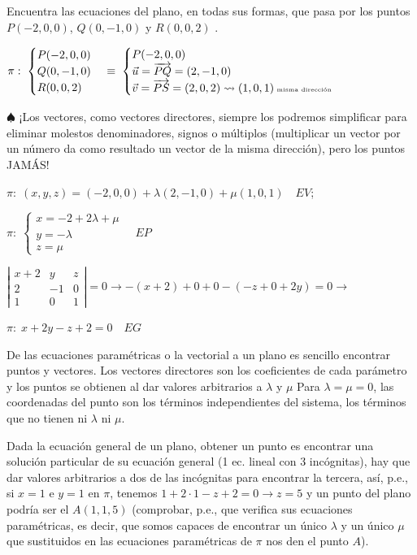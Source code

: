 \justify

\begin{ejem} Encuentra las ecuaciones del plano, en todas sus formas, que pasa por los puntos $P(-2,0,0)$, $Q(0,-1,0)$ y $R(0,0,2)$	.
\end{ejem}

$\pi:\; \begin{cases}  P(-2,0,0)\\Q(0,-1,0)\\R(0,0,2) \end{cases} \equiv \; \begin{cases} P(-2,0,0)\\ \vec u=\overrightarrow{PQ}=(2,-1,0) \\ \vec v=\overrightarrow{PS}=(2,0,2) \rightsquigarrow  (1,0,1) \text{\tiny{ misma dirección}} \end{cases} $	

\noindent \textcolor{gris}{$\spadesuit$ \normalsize{¡Los} vectores, como vectores directores, siempre los podremos simplificar para eliminar molestos denominadores, signos o múltiplos (multiplicar un vector por un número da como resultado un vector de la misma dirección), pero los puntos JAMÁS!} 

$\pi:\; (x,y,z)=(-2,0,0)+\lambda (2,-1,0)+\mu (1,0,1)\quad EV$; 

$\pi:\; \begin{cases} x=-2+2\lambda + \mu \\ y=-\lambda \\ z=\mu \end{cases} \quad EP$  

$\left| \begin{matrix} x+2&y&z\\2&-1&0\\1&0&1  \end{matrix} \right|=0 \to -(x+2)+0+0-(-z+0+2y) =0 \to$ 

$ \pi: \; x+2y-z+2=0 \quad EG$

De las ecuaciones paramétricas o la vectorial a un plano es sencillo encontrar puntos y vectores. Los vectores directores son los coeficientes de cada parámetro y los puntos se obtienen al dar valores arbitrarios a $\lambda$ y $\mu$ \textcolor{gris}{Para $\lambda=\mu=0$, las coordenadas del punto son los términos independientes del sistema, los términos que no tienen ni $\lambda$ ni $\mu$}.

Dada la ecuación general de un plano, obtener un punto es encontrar una solución particular de su ecuación general (1 ec. lineal con 3 incógnitas), hay que dar valores arbitrarios a dos de las incógnitas para encontrar la tercera, así, p.e., si $x=1$ e $y=1$ en $\pi$, tenemos $1+2\cdot1-z+2=0 \to z= 5$ y un punto del plano podría ser el $A(1,1,5)$ (comprobar, p.e., que verifica sus ecuaciones paramétricas, es decir, que somos capaces de encontrar un único $\lambda$ y un único $\mu$ que sustituidos en las ecuaciones paramétricas de $\pi$ nos den el punto $A$).

